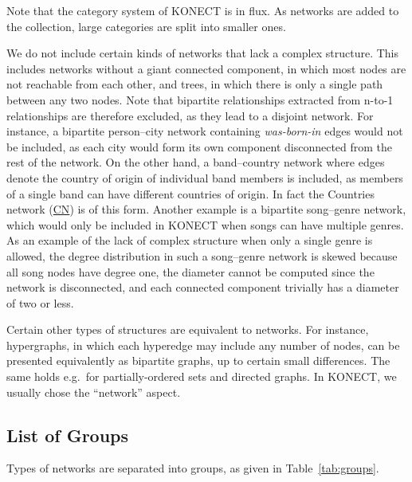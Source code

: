 \documentclass{article}
\begin{document}
Note that the category system of KONECT is in flux.  As networks are
added to the collection, large categories are split into smaller ones. 

We do not include certain kinds of networks that lack a complex
structure. This includes networks without a giant connected component,
in which most nodes are not reachable from each other, and trees, in
which there is only a single path between any two nodes.  Note that
bipartite relationships extracted from n-to-1 relationships are
therefore excluded, as they lead to a disjoint network. For instance, a
bipartite person--city network containing \emph{was-born-in} edges would
not be included, as each city would form its own component disconnected
from the rest of the network.  On the other hand, a band--country
network where edges denote the country of origin of individual band
members is included, as members of a single band can have different
countries of origin. In fact the Countries network
(\href{http://konect.cc/networks/dbpedia-country/}{\textsf{CN}})
is of this form.  Another example is a bipartite song--genre network,
which would only be included in KONECT when songs can have multiple
genres.  As an example of the lack of complex structure when only a
single genre is allowed, the degree distribution in such a song--genre
network is skewed because all song nodes have degree one, the diameter
cannot be computed since the network is disconnected, and each connected
component trivially has a diameter of two or less.

Certain other types of structures are equivalent to networks.  For
instance, hypergraphs, in which each hyperedge may include any number of
nodes, can be presented equivalently as bipartite graphs, up to certain
small differences.  The same holds e.g.\ for partially-ordered sets and
directed graphs.  In KONECT, we usually chose the ``network'' aspect. 

\subsection{List of Groups}
\label{sec:groups}
Types of networks are separated into groups, as given in
Table~\ref{tab:groups}. 
\end{document}
